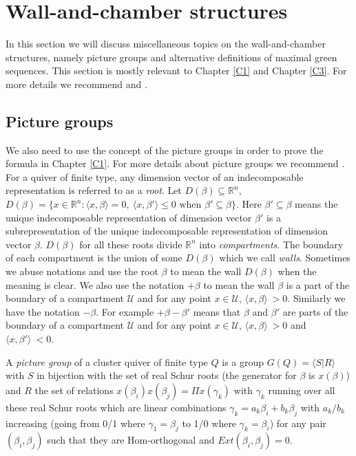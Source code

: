 \section{Wall-and-chamber structures}
\indent In this section we will discuss miscellaneous topics on the wall-and-chamber structures, namely picture groups and alternative definitions of maximal green sequences. This section is mostly relevant to Chapter \ref{C1} and Chapter \ref{C3}. For more details we recommend \cite{GHKK14}\cite{Mul15}\cite{BST17}\cite{BST18A}\cite{BST18B}\cite{IOTW15} and \cite{IT17}.\\
\subsection{Picture groups}\label{Picgr}
\indent We also need to use the concept of the picture groups in order to prove the formula in Chapter \ref{C1}. For more details about picture groups we recommend \cite{IT17}.\\
\indent For a quiver of finite type, any dimension vector of an indecomposable representation is referred to as a \textit{root}. Let $D(\beta)\subseteq\mathbb{R}^n$, $D(\beta)= \{x\in\mathbb{R}^n: \langle x,\beta\rangle=0,\ \langle x,\beta'\rangle\leq 0\text{ when }\beta'\subseteq\beta\}$. Here $\beta'\subseteq\beta$ means the unique indecomposable representation of dimension vector $\beta'$ is a subrepresentation of the unique indecomposable representation of dimension vector $\beta$. $D(\beta)$ for all these roots divide $\mathbb{R}^n$ into \textit{compartments}. The boundary of each compartment is the union of some $D(\beta)$ which we call \textit{walls}.\cite{IT17}\cite{IOTW4} Sometimes we abuse notations and use the root $\beta$ to mean the wall $D(\beta)$ when the meaning is clear. We also use the notation $+\beta$ to mean the wall $\beta$ is a part of the boundary of a compartment $\mathcal{U}$ and for any point $x\in\mathcal{U}$, $\langle x,\beta\rangle\ >0$. Similarly we have the notation $-\beta$. For example $+\beta-\beta'$ means that $\beta$ and $\beta'$ are parts of the boundary of a compartment $\mathcal{U}$ and for any point $x\in\mathcal{U}$, $\langle x,\beta\rangle\ >0$ and $\langle x,\beta'\rangle\ <0$.\\
\begin{definition}
A \textit{picture group} of a cluster quiver of finite type $Q$ is a group $G(Q)=\langle S|R\rangle$ with $S$ in bijection with the set of real Schur roots (the generator for $\beta$ is $x(\beta)$) and $R$ the set of relations $x(\beta_i)x(\beta_j)=\Pi x(\gamma_k)$ with $\gamma_k$ running over all these real Schur roots which are linear combinations $\gamma_k = a_k\beta_i+b_k\beta_j$ with $a_k/b_k$ increasing (going from 0/1 where $\gamma_1=\beta_j$ to 1/0 where $\gamma_k=\beta_i$) for any pair $(\beta_i,\beta_j)$ such that they are Hom-orthogonal and $Ext(\beta_i,\beta_j)=0$. \cite{IT17}\\
\end{definition}
